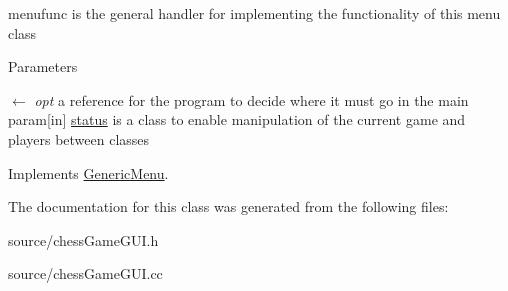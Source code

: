 menufunc is the general handler for implementing the functionality of this menu class 
\begin{DoxyParams}{Parameters}
\item[\mbox{$\leftarrow$} {\em opt}]a reference for the program to decide where it must go in the main param\mbox{[}in\mbox{]} \hyperlink{classstatus}{status} is a class to enable manipulation of the current game and players between classes \end{DoxyParams}


Implements \hyperlink{classGenericMenu_a290ad7ec3331edc968190b1d7b48a397}{GenericMenu}.

The documentation for this class was generated from the following files:\begin{DoxyCompactItemize}
\item 
source/chessGameGUI.h\item 
source/chessGameGUI.cc\end{DoxyCompactItemize}
